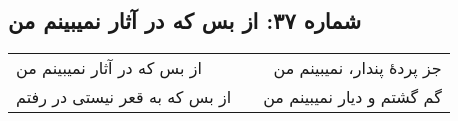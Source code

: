 \begin{center}
\section*{شماره ۳۷: از بس که در آثار نمیبینم من}
\label{sec:037}
\begin{longtable}{l p{0.5cm} r}
از بس که در آثار نمیبینم من
&&
جز پردهٔ پندار، نمیبینم من
\\
از بس که به قعر نیستی در رفتم
&&
گم گشتم و دیار نمیبینم من
\\
\end{longtable}
\end{center}
